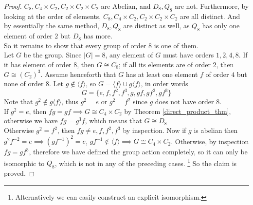 \begin{proof}
    $C_8,C_4\times C_2, C_2\times C_2\times C_2$ are Abelian, and $D_8,Q_8$ are not.
    Furthermore, by looking at the order of elements, $C_8,C_4\times C_2, C_2\times C_2\times C_2$ are all distinct.
    And by essentially the same method, $D_8,Q_8$ are distinct as well, as $Q_8$ has only one element of order $2$ but $D_8$ has more.\\
    So it remains to show that every group of order $8$ is one of them.\\
    Let $G$ be the group.
    Since $|G|=8$, any element of $G$ must have orders $1,2,4,8$.
    If it has element of order $8$, then $G\cong C_8$; if all its elements are of order $2$, then $G\cong (C_2)^3$.
    Assume henceforth that $G$ has at least one element $f$ of order $4$ but none of order $8$.
    Let $g\notin\langle f\rangle$, so $G=\langle f\rangle\cup g\langle f\rangle$, in order words
    $$G=\{e,f,f^2,f^3,g,gf,gf^2,gf^3\}$$
    Note that $g^2\notin g\langle f\rangle$, thus $g^2=e$ or $g^2=f^2$ since $g$ does not have order $8$.\\
    If $g^2=e$, then $fg=gf\implies G\cong C_4\times C_2$ by Theorem \ref{direct_product_thm}, otherwise we have $fg=g^3f$, which means that $G\cong D_8$\\
    Otherwise $g^2=f^2$, then $fg\neq e,f,f^2,f^3$ by inspection.
    Now if $g$ is abelian then $g^2f^{-2}=e\implies (gf^{-1})^2=e$, $gf^{-1}\notin\langle f\rangle\implies G\cong C_4\times C_2$.
    Otherwise, by inspection $fg=gf^3$, therefore we have defined the group action completely, so it can only be isomorphic to $Q_8$, which is not in any of the preceding cases.
    \footnote{Alternatively we can easily construct an explicit isomorphism.}
    So the claim is proved.
\end{proof}
